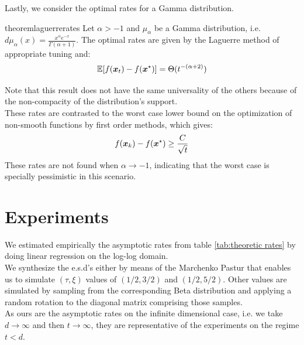 \documentclass{article}
\begin{document}
Lastly, we consider the optimal rates for a Gamma distribution.

\begin{restatable}{theorem}{laguerrerates}
Let $\alpha>-1$ and $\mu_\alpha$ be a Gamma distribution, i.e. $d\mu_\alpha(x)=\frac{x^\alpha e^{-x}}{\Gamma(\alpha+1)}$. The optimal rates are given by the Laguerre method of appropriate tuning and:
\begin{equation}
    \mathbb{E}[f({\boldsymbol x}_t)-f({\boldsymbol x}^\star)]=\Theta(t^{-(\alpha+2)})
\end{equation}
\end{restatable}
Note that this result does not have the same universality of the others because of the non-compacity of the distribution's support.\\
These rates are contrasted  to the worst case lower bound on the optimization of non-smooth functions by first order methods, which gives:
\begin{equation*}
    f({\boldsymbol x}_k)-f({\boldsymbol x}^\star)\geq\frac{C}{\sqrt{t}}
\end{equation*}
These rates are not found when $\alpha\rightarrow-1$, indicating that the worst case is specially pessimistic in this scenario.
\section{Experiments}
We estimated empirically the asymptotic rates from table \ref{tab:theoretic rates} by doing linear regression on the log-log domain. \\
We synthesize the e.s.d's  either by means of the Marchenko Pastur that enables us to simulate $(\tau,\xi)$ values of $(1/2,3/2)$ and $(1/2,5/2)$. Other values are simulated by sampling from the corresponding Beta distribution and applying a random rotation to the diagonal matrix comprising those samples.\\ 
As ours are the asymptotic rates on the infinite dimensional case, i.e. we take $d\rightarrow \infty$ and then $t \rightarrow \infty$, they are representative of the experiments on the regime $t<d$.
\end{document}
